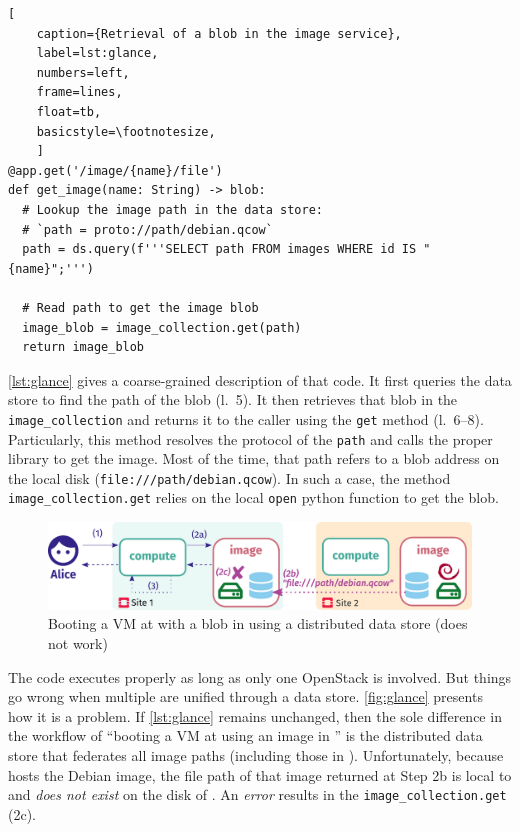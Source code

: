 \begin{lstlisting}[
    caption={Retrieval of a blob in the image service},
    label=lst:glance,
    numbers=left,
    frame=lines,
    float=tb,
    basicstyle=\footnotesize,
    ]
@app.get('/image/{name}/file')
def get_image(name: String) -> blob:
  # Lookup the image path in the data store:
  # `path = proto://path/debian.qcow`
  path = ds.query(f'''SELECT path FROM images WHERE id IS "{name}";''')

  # Read path to get the image blob
  image_blob = image_collection.get(path)
  return image_blob
\end{lstlisting}

\autoref{lst:glance} gives a coarse-grained description of that code.
%
It first queries the data store to find the path of the blob (l.~5).
%
It then retrieves that blob in the \verb|image_collection| and returns
it to the caller using the \verb|get| method (l.~6--8).
%
Particularly, this method resolves the protocol of the \verb/path/ and
calls the proper library to get the image.
%
Most of the time, that path refers to a blob address on the local disk
(\eg \verb|file:///path/debian.qcow|).
%
In such a case, the method \verb|image_collection.get| relies on the
local \verb|open| python function to get the blob.

\begin{figure}[h]
  \centering
  \includegraphics[width=1\linewidth]{figs/pdf/openstack-db-backend}
  \caption{Booting a VM at \sOne with a blob in \sTwo using a
    distributed data store (does not work)}
  \label{fig:glance}
\end{figure}

%
The code executes properly as long as only one OpenStack is involved.
%
But things go wrong when multiple are unified through a data store.
%
\autoref{fig:glance} presents how it is a problem.
%
If \autoref{lst:glance} remains unchanged, then the sole difference in
the workflow of ``booting a VM at \sOne using an image in \sTwo'' is
the distributed data store that federates all image paths (including
those in \sTwo).
%
Unfortunately, because \sTwo hosts the Debian image, the file path of
that image returned at Step 2b is local to \sTwo and \emph{does not
exist} on the disk of \sOne.
%
An \emph{error} results in the \verb|image_collection.get| (2c).


